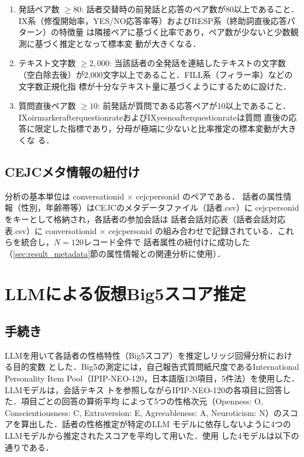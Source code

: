 \documentclass[dvipdfmx,11pt,a4paper]{bxjsarticle}
\renewcommand{\_}{\paperorigunderscore\allowbreak}%
\begin{document}
\begin{enumerate}
  \item 発話ペア数 $\geq 80$: 話者交替時の前発話と応答のペア数が80以上であること．
IX系（修復開始率，YES/NO応答率等）およびRESP系（終助詞直後応答パターン）の特徴量
は隣接ペアに基づく比率であり，ペア数が少ないと少数観測に基づく推定となって標本変
動が大きくなる．
  \item テキスト文字数 $\geq 2{,}000$: 当該話者の全発話を連結したテキストの文字数
（空白除去後）が2,000文字以上であること．FILL系（フィラー率）などの文字数正規化指
標が十分なテキスト量に基づくようにするために設けた．
  \item 質問直後ペア数 $\geq 10$: 前発話が質問である応答ペアが10以上であること．
IX\_oirmarker\_after\_question\_rateおよびIX\_yesno\_after\_question\_rateは質問
直後の応答に限定した指標であり，分母が極端に少ないと比率推定の標本変動が大きくな
る．
\end{enumerate}


\subsection{CEJCメタ情報の紐付け}
分析の基本単位は conversation\_id $\times$ cejc\_person\_id のペアである．
話者の属性情報（性別，年齢帯等）はCEJCのメタデータファイル（話者.csv）に
cejc\_person\_idをキーとして格納され，各話者の参加会話は
話者会話対応表（話者会話対応表.csv）に conversation\_id $\times$ cejc\_person\_id
の組み合わせで記録されている．これらを統合し，$N = 120$レコード全件で
話者属性の紐付けに成功した（\ref{sec:result_metadata}節の属性情報との関連分析に使用）．

\section{LLMによる仮想Big5スコア推定}
\label{sec:big5score}

\subsection{手続き}

LLMを用いて各話者の性格特性（Big5スコア）を推定しリッジ回帰分析における目的変数
とした．Big5の測定には，自己報告式質問紙尺度であるInternational Personality Item
Pool（IPIP-NEO-120，日本語版120項目，5件法）を使用した．LLMモデルは，会話テキス
トを参照しながらIPIP-NEO-120の各項目に回答した．項目ごとの回答の算術平均
によって5つの性格次元（Openness: O, Conscientiousness: C, Extraversion: E,
Agreeableness: A, Neuroticism: N）のスコアを算出した．話者の性格推定が特定のLLM
モデルに依存しないように4つのLLMモデルから推定されたスコアを平均して用いた．使用
した4モデルは以下の通りである．
\end{document}

